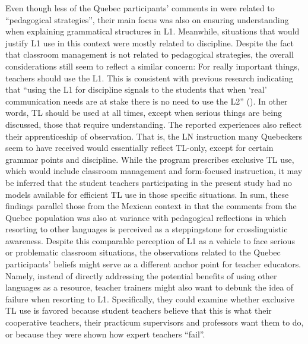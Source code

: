 \documentclass[output=paper]{../langscibook}
\begin{document}
Even though less of the Quebec participants’ comments in were related to “pedagogical strategies”, their main focus was also on ensuring understanding when explaining grammatical structures in L1. Meanwhile, situations that would justify L1 use in this context were mostly related to discipline. Despite the fact that classroom management is not related to pedagogical strategies, the overall considerations still seem to reflect a similar concern: For really important things, teachers should use the L1. This is consistent with previous research indicating that “using the L1 for discipline signals to the students that when ‘real’ communication needs are at stake there is no need to use the L2” (\citealt[234]{EllisShintani2014}). In other words, TL should be used at all times, except when serious things are being discussed, those that require understanding. The reported experiences also reflect their apprenticeship of observation. That is, the LN instruction many Quebeckers seem to have received would essentially reflect TL-only, except for certain grammar points and discipline. While the program prescribes exclusive TL use, which would include classroom management and form-focused instruction, it may be inferred that the student teachers participating in the present study had no models available for efficient TL use in those specific situations. In sum, these findings parallel those from the Mexican context in that the comments from the Quebec population was also at variance with pedagogical reflections in which resorting to other languages is perceived as a steppingstone for crosslinguistic awareness. Despite this comparable perception of L1 as a vehicle to face serious or problematic classroom situations, the observations related to the Quebec participants’ beliefs might serve as a different anchor point for teacher educators. Namely, instead of directly addressing the potential benefits of using other languages as a resource, teacher trainers might also want to debunk the idea of failure when resorting to L1. Specifically, they could examine whether exclusive TL use is favored because student teachers believe that this is what their cooperative teachers, their practicum supervisors and professors want them to do, or because they were shown how expert teachers “fail”.
\end{document}
